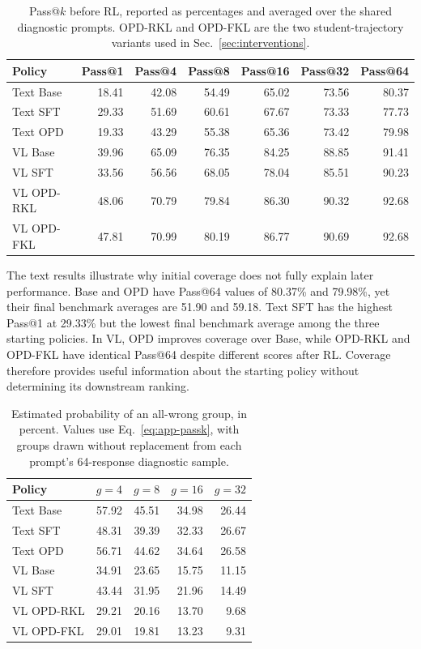 \documentclass[]{jingdong}
\theoremstyle{plain}
\theoremstyle{definition}
\theoremstyle{remark}
\begin{document}
\begin{table}[H]
\centering
\small
\caption{Pass@$k$ before RL, reported as percentages and averaged over the shared diagnostic prompts. OPD-RKL and OPD-FKL are the two student-trajectory variants used in Sec.~\ref{sec:interventions}.}
\label{tab:app-passk}
\setlength{\tabcolsep}{3pt}
\renewcommand{\arraystretch}{1.08}
\begin{tabular*}{\linewidth}{@{\extracolsep{\fill}}lrrrrrr@{}}
\toprule
Policy & Pass@1 & Pass@4 & Pass@8 & Pass@16 & Pass@32 & Pass@64 \\
\midrule
Text Base & 18.41 & 42.08 & 54.49 & 65.02 & 73.56 & 80.37 \\
Text SFT & 29.33 & 51.69 & 60.61 & 67.67 & 73.33 & 77.73 \\
Text OPD & 19.33 & 43.29 & 55.38 & 65.36 & 73.42 & 79.98 \\
\midrule
VL Base & 39.96 & 65.09 & 76.35 & 84.25 & 88.85 & 91.41 \\
VL SFT & 33.56 & 56.56 & 68.05 & 78.04 & 85.51 & 90.23 \\
VL OPD-RKL & 48.06 & 70.79 & 79.84 & 86.30 & 90.32 & 92.68 \\
VL OPD-FKL & 47.81 & 70.99 & 80.19 & 86.77 & 90.69 & 92.68 \\
\bottomrule
\end{tabular*}
\end{table}


The text results illustrate why initial coverage does not fully explain later performance. Base and OPD have Pass@64 values of 80.37\% and 79.98\%, yet their final benchmark averages are 51.90 and 59.18. Text SFT has the highest Pass@1 at 29.33\% but the lowest final benchmark average among the three starting policies. In VL, OPD improves coverage over Base, while OPD-RKL and OPD-FKL have identical Pass@64 despite different scores after RL. Coverage therefore provides useful information about the starting policy without determining its downstream ranking.

\begin{table}[H]
\centering
\small
\caption{Estimated probability of an all-wrong group, in percent. Values use Eq.~\ref{eq:app-passk}, with groups drawn without replacement from each prompt's 64-response diagnostic sample.}
\label{tab:app-all-wrong-groups}
\setlength{\tabcolsep}{3pt}
\renewcommand{\arraystretch}{1.08}
\begin{tabular*}{\linewidth}{@{\extracolsep{\fill}}lrrrr@{}}
\toprule
Policy & $g=4$ & $g=8$ & $g=16$ & $g=32$ \\
\midrule
Text Base & 57.92 & 45.51 & 34.98 & 26.44 \\
Text SFT & 48.31 & 39.39 & 32.33 & 26.67 \\
Text OPD & 56.71 & 44.62 & 34.64 & 26.58 \\
\midrule
VL Base & 34.91 & 23.65 & 15.75 & 11.15 \\
VL SFT & 43.44 & 31.95 & 21.96 & 14.49 \\
VL OPD-RKL & 29.21 & 20.16 & 13.70 & 9.68 \\
VL OPD-FKL & 29.01 & 19.81 & 13.23 & 9.31 \\
\bottomrule
\end{tabular*}
\end{table}
\end{document}

